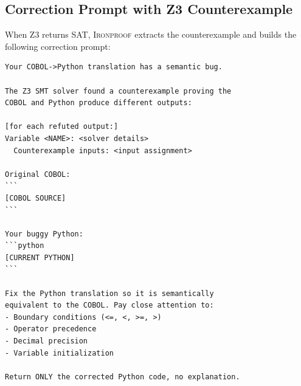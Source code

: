 \documentclass[sigconf,nonacm]{acmart}
\begin{document}
\subsection{Correction Prompt with Z3 Counterexample}

When Z3 returns SAT, \textsc{Ironproof} extracts the counterexample and builds the following correction prompt:

\begin{lstlisting}[style=z3style,caption={Correction prompt template, from \texttt{translate\_with\_feedback\_loop} in \texttt{ironproof\_core.py}; bracketed parts are filled at run time.},label={lst:correction-prompt},float=tbp]
Your COBOL->Python translation has a semantic bug.

The Z3 SMT solver found a counterexample proving the
COBOL and Python produce different outputs:

[for each refuted output:]
Variable <NAME>: <solver details>
  Counterexample inputs: <input assignment>

Original COBOL:
```
[COBOL SOURCE]
```

Your buggy Python:
```python
[CURRENT PYTHON]
```

Fix the Python translation so it is semantically
equivalent to the COBOL. Pay close attention to:
- Boundary conditions (<=, <, >=, >)
- Operator precedence
- Decimal precision
- Variable initialization

Return ONLY the corrected Python code, no explanation.
\end{lstlisting}
\end{document}
